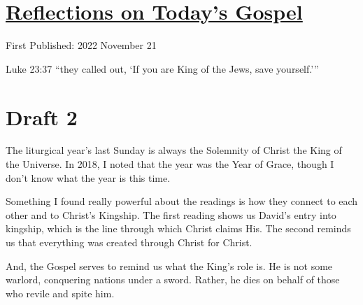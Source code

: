 \documentclass[12pt]{article}[titlepage]
\newcommand{\say}[1]{``#1''}
\newcommand{\nsay}[1]{`#1'}
\newcommand{\1}{\={a}}
\newcommand{\2}{\={e}}
\newcommand{\3}{\={\i}}
\newcommand{\4}{\=o}
\newcommand{\5}{\=u}
\newcommand{\6}{\={A}}
\renewcommand{\,}{\textsuperscript{,}}
\begin{document}
\doublespacing
\section{\href{reflections-on-readings-christ-king-c-22.html}{Reflections on Today's Gospel}}
First Published: 2022 November 21

Luke 23:37 \say{they called out, \nsay{If you are King of the Jews, save yourself.}}
\section{Draft 2}
The liturgical year's last Sunday is always the Solemnity of Christ the King of the Universe.
In 2018, I noted that the year was the Year of Grace, though I don't know what the year is this time.

Something I found really powerful about the readings is how they connect to each other and to Christ's Kingship.
The first reading shows us David's entry into kingship, which is the line through which Christ claims His.
The second reminds us that everything was created through Christ for Christ.

And, the Gospel serves to remind us what the King's role is.
He is not some warlord, conquering nations under a sword.
Rather, he dies on behalf of those who revile and spite him.
\end{document}

